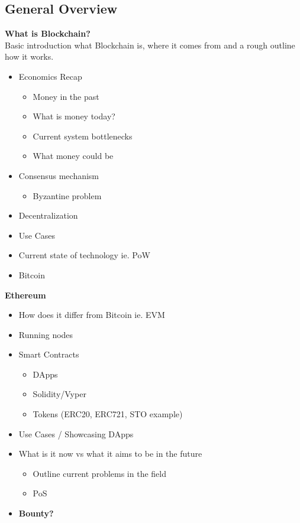\subsection{General Overview}
\textbf{What is Blockchain?} \\ %
Basic introduction what Blockchain is, where it comes from and a rough outline how it works.
\begin{itemize}
    \item Economics Recap %
    \begin{itemize}
        \item Money in the past
        \item What is money today?
        \item Current system bottlenecks
        \item What money could be
    \end{itemize}
    \item Consensus mechanism
        \begin{itemize}
            \item Byzantine problem
        \end{itemize}
    \item Decentralization
    \item Use Cases
    \item Current state of technology ie. PoW
    \item Bitcoin
\end{itemize}

\noindent\textbf{Ethereum}%
\begin{itemize}
    \item How does it differ from Bitcoin ie. EVM
    \item Running nodes
    \item Smart Contracts
    \begin{itemize}
        \item DApps
        \item Solidity/Vyper
        \item Tokens (ERC20, ERC721, STO example)
    \end{itemize}
    \item Use Cases / Showcasing DApps
    \item What is it now vs what it aims to be in the future
    \begin{itemize}
        \item Outline current problems in the field
        \item PoS
    \end{itemize}
    \item \textbf{Bounty?}
\end{itemize}